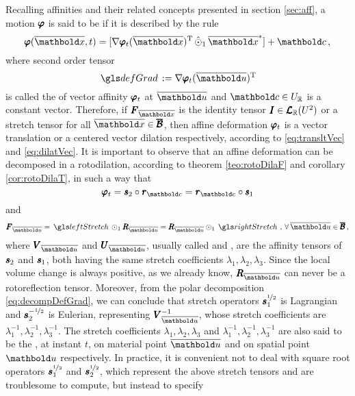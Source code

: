 Recalling affinities and their related concepts presented in section \ref{sec:aff}, a motion $\pmb{\varphi}$ is said to be  if it is described by the rule 
\begin{equation}\label{eq:affDeform}
\fua{\tnr{\varphi}}{\overline{\vto{x}},t} =[\fua{\nabla\tnr{\varphi}_t}{\overline{\vto{x}}}^\text{T}\,\hat{\odot}_1\,\overline{\vto{x}}^*] + \vto{c}\,, 
\end{equation}
where second order tensor 
\begin{equation}
\gloref{defGrad}:=\fua{\nabla\tnr{\varphi}_t}{\overline{\vto{u}}}^\text{T}
\end{equation}
is called the  of vector affinity $\pmb{\varphi}_t$ at $\overline{\vto{u}}$ and $\vto{c}\in U_\real$ is a constant vector. Therefore, if $\tnr{F}_{\overline{\vto{x}}}$ is the identity tensor $\pmb{I}\in\pmb{\mathcal{L}}_{\mathbb{R}}(U^{2})$ or a stretch tensor for all $\overline{\vto{x}}\in\tnr{\overline{\mathcal{B}}}$, then affine deformation $\pmb{\varphi}_t$ is a vector translation or a centered vector dilation respectively, according to \eqref{eq:transltVec} and \eqref{eq:dilatVec}. It is important to observe that an affine deformation can be decomposed in a rotodilation, according to theorem \ref{teo:rotoDilaF} and corollary \ref{cor:rotoDilaT}, in such a way that 
\begin{equation}\label{eq:decompDefGrad}
\tnr{\varphi}_t = \tnr{\mathit{s}}_2\circ\tnr{\mathit{r}}_{\vto{c}} = \tnr{\mathit{r}}_{\vto{c}}\circ\tnr{\mathit{s}}_1
\end{equation}
and
\begin{equation}
\tnr{F}_{\overline{\vto{u}}}=\gloref{leftStretch}\odot_1\tnr{R}_{\overline{\vto{u}}}=\tnr{R}_{\overline{\vto{u}}}\odot_1\gloref{rightStretch}\,,\,\forall\, \overline{\vto{u}}\in\tnr{\overline{\mathcal{B}}}\,, 
\end{equation}
where $\tnr{V}_{\overline{\vto{u}}}$ and $\tnr{U}_{\overline{\vto{u}}}$, usually called  and , are the affinity tensors of $\pmb{\mathit{s}}_2$ and $\pmb{\mathit{s}}_1$, both having the same stretch coefficients $\lambda_1,\lambda_2,\lambda_3$. Since the local volume change is always positive, as we already know, $\tnr{R}_{\overline{\vto{u}}}$ can never be a rotoreflection tensor. Moreover, from the polar decomposition \eqref{eq:decompDefGrad}, we can conclude that stretch operators $\pmb{s}_1^{\nicefrac{1}{2}}$ is Lagrangian and $\pmb{s}_2^{-\nicefrac{1}{2}}$ is Eulerian, representing $\tnr{V}_{\overline{\vto{u}}}^{-1}$, whose stretch coefficients are $\lambda_1^{-1},\lambda_2^{-1},\lambda_3^{-1}$. The stretch coefficients $\lambda_1,\lambda_2,\lambda_3$ and $\lambda_1^{-1},\lambda_2^{-1},\lambda_3^{-1}$ are also said to be the , at instant $t$, on material point $\overline{\vto{u}}$ and on spatial point $\vto{u}$ respectively. In practice, it is convenient not to deal with square root operators $\pmb{s}_1^{\nicefrac{1}{2}}$ and $\pmb{s}_2^{\nicefrac{1}{2}}$, which represent the above stretch tensors and are troublesome to compute, but instead to specify 
